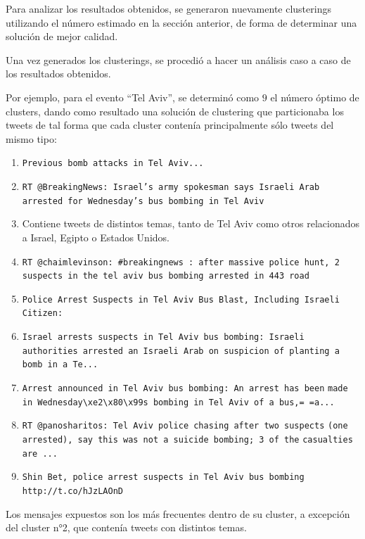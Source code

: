     Para analizar los resultados obtenidos, se generaron nuevamente
    clusterings utilizando el número estimado en la sección anterior, de
    forma de determinar una solución de mejor calidad.

    Una vez generados los clusterings, se procedió a hacer un análisis
    caso a caso de los resultados obtenidos.

    Por ejemplo, para el evento ``Tel Aviv'', se determinó como $9$ el
    número óptimo de clusters, dando como resultado una solución de
    clustering que particionaba los tweets de tal forma que cada
    cluster contenía principalmente sólo tweets del mismo tipo:

\begin{enumerate}
\item \texttt{Previous bomb attacks in Tel Aviv...}
\item \texttt{RT @BreakingNews: Israel's army spokesman says Israeli Arab        arrested for Wednesday's bus bombing in Tel Aviv}
\item Contiene tweets de distintos temas, tanto de Tel Aviv como
       otros relacionados a Israel, Egipto o Estados Unidos.
\item \texttt{RT @chaimlevinson: \#breakingnews : after massive  police hunt,        2  suspects in the tel aviv bus bombing arrested in 443 road}
\item \texttt{Police Arrest Suspects in Tel Aviv Bus Blast, Including        Israeli Citizen:}
\item \texttt{Israel arrests suspects in Tel Aviv bus bombing: Israeli}
       \texttt{authorities arrested an Israeli Arab on suspicion of planting a}
       \texttt{bomb in a Te...}
\item \texttt{Arrest announced in Tel Aviv bus bombing: An arrest has been}
       \texttt{made in Wednesday\textbackslash{}xe2\textbackslash{}x80\textbackslash{}x99s bombing in Tel Aviv of a bus,=        =a...}
\item \texttt{RT @panosharitos: Tel Aviv police chasing after two suspects}
       \texttt{(one arrested), say this was not a suicide bombing; 3 of the}
       \texttt{casualties are ...}
\item \texttt{Shin Bet, police arrest suspects in Tel Aviv bus bombing}
       \texttt{http://t.co/hJzLAOnD}
\end{enumerate}
    Los mensajes expuestos son los más frecuentes dentro de su
    cluster, a excepción del cluster n°2, que contenía tweets con
    distintos temas.

